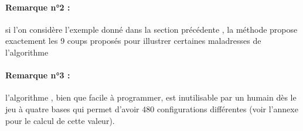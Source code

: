 \paragraph{Remarque n°2 :} \hspace{-1em} si l'on considère l'exemple donné dans la section précédente , la méthode  propose exactement les 9 coups proposés pour illustrer certaines maladresses de l'algorithme 


\paragraph{Remarque n°3 :} \hspace{-1em} l'algorithme , bien que facile à programmer, est inutilisable par un humain dès le jeu à quatre bases qui permet d'avoir $480$ configurations différentes (voir l'annexe pour le calcul de cette valeur).
